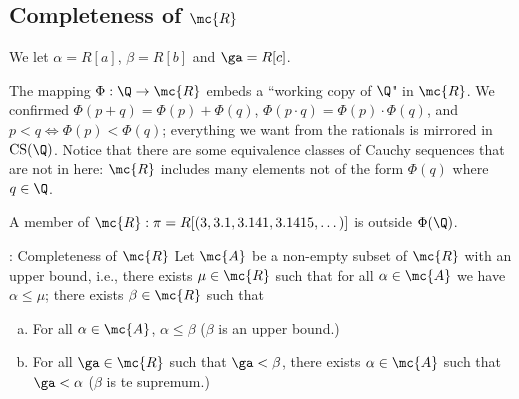\subsection{Completeness of \(\mc{R}\)}
\begin{notation}
	We let \(\alpha=R[a]\), \(\beta=R[b]\) and \(\ga=R[c]\).
\end{notation}
\begin{reflection}
	The mapping \(\Phi:\Q\to\mc{R}\) embeds a ``working copy of \(\Q\)" in \(\mc{R}\). We confirmed \(\Phi(p+q)=\Phi(p)+\Phi(q)\), \(\Phi(p\cdot q)=\Phi(p)\cdot\Phi(q)\), and \(p<q\iff \Phi(p)<\Phi(q)\); everything we want from the rationals is mirrored in \(\text{CS}(\Q)\). Notice that there are some equivalence classes of Cauchy sequences that are not in here: \(\mc{R}\) includes many elements not of the form \(\Phi(q)\) where \(q\in\Q\). 
	\begin{example}
		A member of \(\mc{R}:\pi=R[(3,3.1,3.141,3.1415,\dots)]\) is outside \(\Phi(\Q)\).
	\end{example}
\end{reflection}
\begin{ntheorem}{: Completeness of \(\mc{R}\)}
	Let \(\mc{A}\) be a non-empty subset of \(\mc{R}\) with an upper bound, i.e., there exists \(\mu\in\mc{R}\) such that for all \(\alpha\in\mc{A}\) we have \(\alpha\leq\mu\); there exists \(\beta\in\mc{R}\) such that 
	\begin{enumerate}[(a)]
		\item For all \(\alpha\in\mc{A}\), \(\alpha\leq\beta\) (\(\beta\) is an upper bound.)
		
		\item For all \(\ga\in\mc{R}\) such that \(\ga<\beta\), there exists \(\alpha\in\mc{A}\) such that \(\ga<\alpha\) (\(\beta\) is te supremum.)
	\end{enumerate}
\end{ntheorem}
